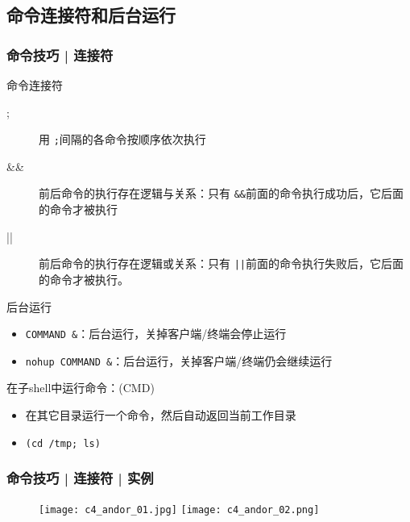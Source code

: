 \subsection{命令连接符和后台运行}
\begin{frame}[fragile]
  \frametitle{命令技巧 | \alert{连接符}}
  \begin{block}{命令连接符}
    \begin{description}
      \item[;] 用 \verb|;|间隔的各命令按顺序依次执行
      \item[\&\&] 前后命令的执行存在逻辑与关系：只有 \verb|&&|前面的命令执行成功后，它后面的命令才被执行
      \item[||] 前后命令的执行存在逻辑或关系：只有 \verb=||=前面的命令执行失败后，它后面的命令才被执行。
    \end{description}
  \end{block}
  \pause
  \vspace{-0.5em}
  \begin{block}{后台运行}
    \begin{itemize}
      \item \verb|COMMAND &|：后台运行，关掉客户端/终端会停止运行
      \item \verb|nohup COMMAND &|：后台运行，关掉客户端/终端仍会继续运行
    \end{itemize}
  \end{block}
  \pause
  \vspace{-0.5em}
  \begin{block}{在子shell中运行命令：(CMD)}
    \begin{itemize}
      \item 在其它目录运行一个命令，然后自动返回当前工作目录
      \item \verb|(cd /tmp; ls)|
    \end{itemize}
  \end{block}
\end{frame}

\begin{frame}
  \frametitle{命令技巧 | 连接符 | 实例}
  \begin{figure}
  \centering
    \texttt{[image: c4\_andor\_01.jpg]}
    \vspace{0.3cm}
    \texttt{[image: c4\_andor\_02.png]}
  \end{figure}
\end{frame}

